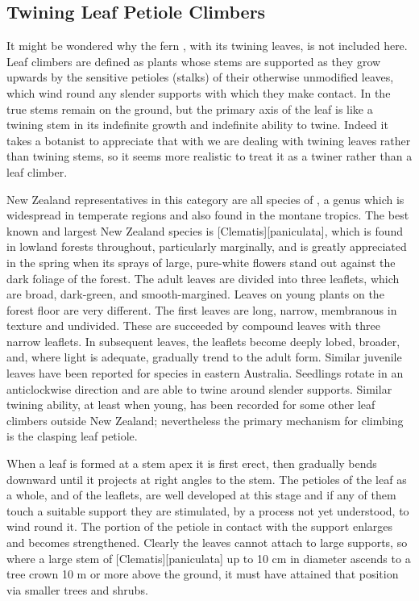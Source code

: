 \subsection{Twining Leaf Petiole Climbers}

It might be wondered why the fern , with its twining leaves, is not included here.
Leaf climbers are defined as plants whose stems are supported as they grow upwards by the sensitive petioles (stalks) of their otherwise unmodified leaves, which wind round any slender supports with which they make contact.
In  the true stems remain on the ground, but the primary axis of the leaf is like a twining stem in its indefinite growth and indefinite ability to twine.
Indeed it takes a botanist to appreciate that with  we are dealing with twining leaves rather than twining stems, so it seems more realistic to treat it as a twiner rather than a leaf climber.

New Zealand representatives in this category are all species of , a genus which is widespread in temperate regions and also found in the montane tropics.
The best known and largest New Zealand species is [Clematis][paniculata], which is found in lowland forests throughout, particularly marginally, and is greatly appreciated in the spring when its sprays of large, pure-white flowers stand out against the dark foliage of the forest.
The adult leaves are divided into three leaflets, which are broad, dark-green, and smooth-margined.
Leaves on young plants on the forest floor are very different.
The first leaves are long, narrow, membranous in texture and undivided.
These are succeeded by compound leaves with three narrow leaflets.
In subsequent leaves, the leaflets become deeply lobed, broader, and, where light is adequate, gradually trend to the adult form.
Similar juvenile leaves have been reported for  species in eastern Australia.
Seedlings rotate in an anticlockwise direction and are able to twine around slender supports.
Similar twining ability, at least when young, has been recorded for some other leaf climbers outside New Zealand; nevertheless the primary mechanism for climbing is the clasping leaf petiole.

When a leaf is formed at a stem apex it is first erect, then gradually bends downward until it projects at right angles to the stem.
The petioles of the leaf as a whole, and of the leaflets, are well developed at this stage and if any of them touch a suitable support they are stimulated, by a process not yet understood, to wind round it.
The portion of the petiole in contact with the support enlarges and becomes strengthened.
Clearly the leaves cannot attach to large supports, so where a large stem of [Clematis][paniculata] up to 10 cm in diameter ascends to a tree crown 10 m or more above the ground, it must have attained that position via smaller trees and shrubs.

